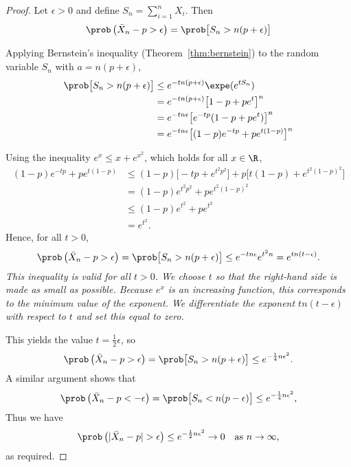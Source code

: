 \begin{proof}
Let $\epsilon>0$ and define $S_n=\sum_{i=1}^n X_i$. Then
\[
\prob\left(\bar{X}_n - p > \epsilon\right)
	= \prob\big[S_n > n(p+\epsilon)\big]
\]


Applying Bernstein's inequality (Theorem~\ref{thm:bernstein}) to the random variable $S_n$ with $a = n(p+\epsilon)$,
\begin{align*}
\prob\big[S_n > n(p+\epsilon)\big]
	& \leq e^{-tn(p+\epsilon)}\expe(e^{tS_n}) \\
	& = e^{-tn(p+\epsilon)}\big[1-p+pe^t\big]^n \\
	& = e^{-tn\epsilon}\big[ e^{-tp}(1-p+pe^t) \big]^n \\
	& = e^{-tn\epsilon}\big[ (1-p)e^{-tp} + pe^{t(1-p)} \big]^n
\end{align*}

Using the inequality $e^x \leq x + e^{x^2}$, which holds for all $x\in\R$, %
\begin{align*}
(1-p)e^{-tp} + pe^{t(1-p)}  
	& \leq (1-p)\big[-tp + e^{t^2p^2}\big] + p\big[t(1-p) + e^{t^2(1-p)^2}\big] \\
	& = (1-p)e^{t^2p^2} + pe^{t^2(1-p)^2} \\
	& \leq (1-p)e^{t^2} + pe^{t^2} \\
	& = e^{t^2}.
\end{align*}
Hence, for all $t>0$,
\[
\prob\left(\bar{X}_n -p > \epsilon\right) = \prob\big[S_n > n(p+\epsilon)\big] \leq e^{-tn\epsilon}e^{t^2n} = e^{tn(t-\epsilon)}.
\]
\bit
\it This inequality is valid for all $t>0$. 
\it We choose $t$ so that the right-hand side is made as small as possible. 
\it Because $e^x$ is an increasing function, this corresponds to the minimum value of the exponent. 
\it We differentiate the exponent $tn(t-\epsilon)$ with respect to $t$ and set this equal to zero.
\eit

This yields the value $t = \frac{1}{2}\epsilon$, so
\[
\prob\left(\bar{X}_n -p > \epsilon\right) = \prob\big[S_n > n(p+\epsilon)\big] \leq e^{-\frac{1}{4}n\epsilon^2}.
\]
A similar argument shows that 
\[
\prob\left(\bar{X}_n -p < -\epsilon\right) = \prob\big[S_n < n(p-\epsilon)\big] \leq e^{-\frac{1}{4}n\epsilon^2},
\]
Thus we have
\[
\prob\left(|\bar{X}_n - p| > \epsilon\right) \leq e^{-\frac{1}{2}n\epsilon^2} \to 0 \text{\quad as $n\to\infty$,}
\]
as required.
\end{proof}

